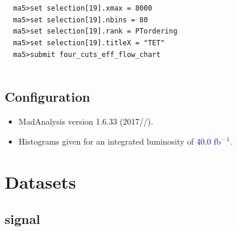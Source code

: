 \documentclass[a4paper, 10pt]{article}
\begin{document}
\texttt{ }\texttt{ }\texttt{ma5>set selection[19].xmax = 8000\\
}
\texttt{ }\texttt{ }\texttt{ma5>set selection[19].nbins = 80\\
}
\texttt{ }\texttt{ }\texttt{ma5>set selection[19].rank = PTordering\\
}
\texttt{ }\texttt{ }\texttt{ma5>set selection[19].titleX = "TET"\\
}
\texttt{ }\texttt{ }\texttt{ma5>submit four\_cuts\_eff\_flow\_chart\\
}
\texttt{ }\texttt{ }\subsection{ Configuration}

\begin{itemize}
  \item MadAnalysis version 1.6.33 (2017//).
   \item Histograms given for an integrated luminosity of \textcolor{blue}{40.0}\textcolor{blue}{ fb}$^{\textcolor{blue}{-1}}$\textcolor{blue}{.}
\textcolor{blue}{}
\end{itemize}
\newpage
\section{ Datasets}

\subsection{ signal}
\end{document}
